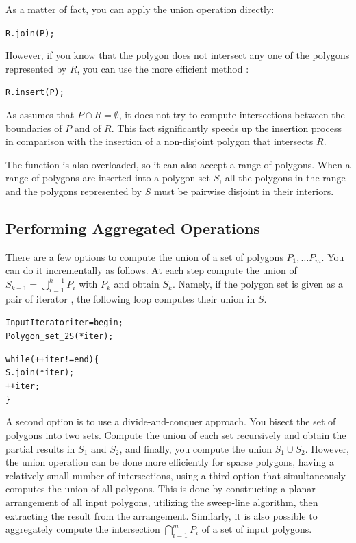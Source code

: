 As a matter of fact, you can apply the union operation directly:
\begin{alltt}
  R.join (P);
\end{alltt}

However, if you know that the polygon does not intersect any one of the
polygons represented by $R$, you can use the more efficient method
:
\begin{alltt}
  R.insert (P);
\end{alltt}

As  assumes that $P \cap R = \emptyset$, it does not try to
compute intersections between the boundaries of $P$ and of $R$. This
fact significantly speeds up the insertion process in comparison with the
insertion of a non-disjoint polygon that intersects $R$.

The  function is also overloaded, so it can also accept a
range of polygons. When a range of polygons are inserted into a
polygon set $S$, all the polygons in the range and the polygons represented 
by $S$ must be pairwise disjoint in their interiors.

\subsection{Performing Aggregated Operations\label{bso_ssec:agg_ops}}

There are a few options to compute the union of a set of polygons
$P_1, \ldots P_m$. You can do it incrementally as follows. At each step
compute the union of $S_{k-1} = \bigcup_{i=1}^{k-1}{P_i}$ 
with $P_{k}$ and obtain $S_k$. Namely, if the polygon set is given
as a pair of iterator \ccc{[begin, end)}, the following loop computes
their union in $S$.
\begin{alltt}
  InputIterator iter = begin;
  Polygon_set_2 S (*iter);

  while (++iter != end) \{
    S.join (*iter);
    ++iter;
  \}
\end{alltt}  
A second option is to use a divide-and-conquer approach. You bisect
the set of polygons into two sets. Compute the union of each set
recursively and obtain the partial results in $S_1$ and $S_2$, and
finally, you compute the union $S_1 \cup S_2$. However, the union
operation can be done more efficiently for sparse polygons, having
a relatively small number of intersections, using a third option that
simultaneously computes the union of all polygons. This is done by 
constructing a planar arrangement of all input polygons, utilizing the
sweep-line algorithm, then extracting the result from the
arrangement. Similarly, it is also possible to aggregately compute the
intersection $\bigcap_{i=1}^{m}{P_i}$ of a set of input polygons.

